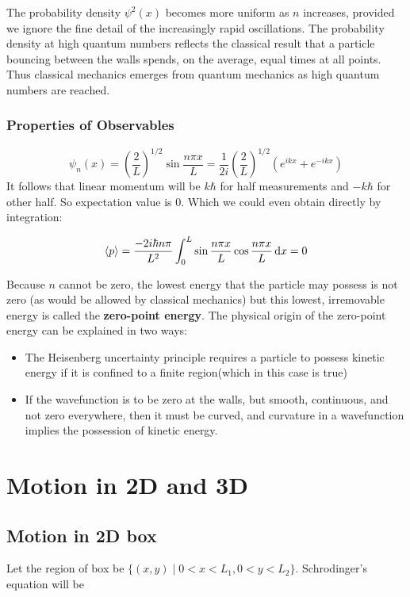 \documentclass[11pt]{article}
\theoremstyle{definition}
\begin{document}
The probability density $\psi^2(x)$ becomes more uniform as $n$ increases, provided we ignore the fine detail of the increasingly rapid oscillations. The probability density at high quantum numbers reflects the classical result that a particle bouncing between the walls spends, on the average, equal times at all points. Thus classical mechanics emerges from quantum mechanics as high quantum numbers are reached.
\subsubsection{Properties of Observables}

$$\psi_n(x) = \left(\frac{2}{L}\right)^{1/2}\sin{\frac{n\pi x}{L}} = \frac{1}{2i}\left(\frac{2}{L}\right)^{1/2} (e^{ikx} + e^{-ikx})$$
It follows that linear momentum will be $k\hbar$ for half measurements and $-k\hbar$ for other half. So expectation value is 0. Which we could even obtain directly by integration:

\begin{equation*}
    \expval{p} =  \frac{-2 i\hbar n \pi}{L^2} \int_0 ^L \sin{\frac{n\pi x}{L}} \cos{\frac{n \pi x}{L}} \dd{x} = 0
\end{equation*}

Because $n$ cannot be zero, the lowest energy that the particle may possess is not zero (as would be allowed by classical mechanics) but this lowest, irremovable energy is called the \textbf{zero-point energy}. The physical origin of the zero-point energy can be explained in two ways:

\begin{itemize}
    \item The Heisenberg uncertainty principle requires a particle to possess kinetic energy if it is confined to a finite region(which in this case is true)
    \item If the wavefunction is to be zero at the walls, but smooth, continuous, and not zero everywhere, then it must be curved, and curvature in a wavefunction implies the possession of kinetic energy.
\end{itemize}
\section{Motion in 2D and 3D}
\subsection{Motion in 2D box}
Let the region of box be $\{(x,y) \mid 0<x<L_1, 0<y<L_2 \}$.
Schrodinger's equation will be 
\end{document}
